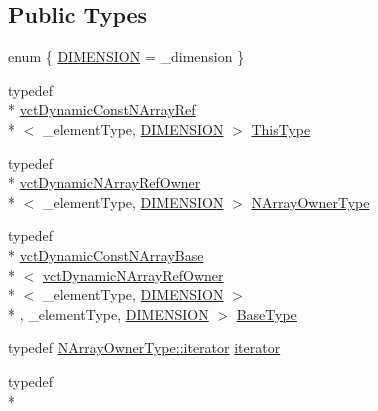 \subsection*{Public Types}
\begin{DoxyCompactItemize}
\item 
enum \{ \hyperlink{classvct_dynamic_const_n_array_ref_ae8d52484153d181fd3ac08be58589848ae003ed9f88ed51f50c6c180506995b93}{D\-I\-M\-E\-N\-S\-I\-O\-N} = \-\_\-dimension
 \}
\item 
typedef \\*
\hyperlink{classvct_dynamic_const_n_array_ref}{vct\-Dynamic\-Const\-N\-Array\-Ref}\\*
$<$ \-\_\-element\-Type, \hyperlink{classvct_dynamic_const_n_array_ref_ae8d52484153d181fd3ac08be58589848ae003ed9f88ed51f50c6c180506995b93}{D\-I\-M\-E\-N\-S\-I\-O\-N} $>$ \hyperlink{classvct_dynamic_const_n_array_ref_aa156bc5f7cf482d155b45f75c59a3c72}{This\-Type}
\item 
typedef \\*
\hyperlink{classvct_dynamic_n_array_ref_owner}{vct\-Dynamic\-N\-Array\-Ref\-Owner}\\*
$<$ \-\_\-element\-Type, \hyperlink{classvct_dynamic_const_n_array_ref_ae8d52484153d181fd3ac08be58589848ae003ed9f88ed51f50c6c180506995b93}{D\-I\-M\-E\-N\-S\-I\-O\-N} $>$ \hyperlink{classvct_dynamic_const_n_array_ref_a0dc3cb1f3a96c6cf28da6084c4072151}{N\-Array\-Owner\-Type}
\item 
typedef \\*
\hyperlink{classvct_dynamic_const_n_array_base}{vct\-Dynamic\-Const\-N\-Array\-Base}\\*
$<$ \hyperlink{classvct_dynamic_n_array_ref_owner}{vct\-Dynamic\-N\-Array\-Ref\-Owner}\\*
$<$ \-\_\-element\-Type, \hyperlink{classvct_dynamic_const_n_array_ref_ae8d52484153d181fd3ac08be58589848ae003ed9f88ed51f50c6c180506995b93}{D\-I\-M\-E\-N\-S\-I\-O\-N} $>$\\*
, \-\_\-element\-Type, \hyperlink{classvct_dynamic_const_n_array_ref_ae8d52484153d181fd3ac08be58589848ae003ed9f88ed51f50c6c180506995b93}{D\-I\-M\-E\-N\-S\-I\-O\-N} $>$ \hyperlink{classvct_dynamic_const_n_array_ref_a8f6858abb088ed618d4cb4cea8309199}{Base\-Type}
\item 
typedef \hyperlink{classvct_dynamic_n_array_ref_owner_a9d68370074a5320a30354e700207ad71}{N\-Array\-Owner\-Type\-::iterator} \hyperlink{classvct_dynamic_const_n_array_ref_a29ec06cf468998d878719954c10bc973}{iterator}
\item 
typedef \\*

\end{DoxyCompactItemize}
